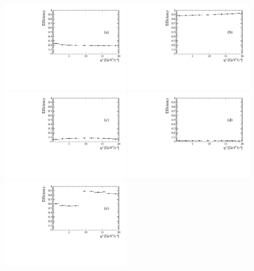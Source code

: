 	

\begin{figure}
\centering
\includegraphics[width=0.48\textwidth]{Lmumu/figs/efficiencies/BR/effvsq2_DD_geom.pdf}
\includegraphics[width=0.48\textwidth]{Lmumu/figs/efficiencies/BR/effvsq2_DD_det.pdf}
\includegraphics[width=0.48\textwidth]{Lmumu/figs/efficiencies/BR/effvsq2_DD_reco.pdf}
\includegraphics[width=0.48\textwidth]{Lmumu/figs/efficiencies/BR/effvsq2_LL_reco.pdf}
\includegraphics[width=0.48\textwidth]{Lmumu/figs/efficiencies/BR/effvsq2_DD_mva.pdf}

\end{figure}
